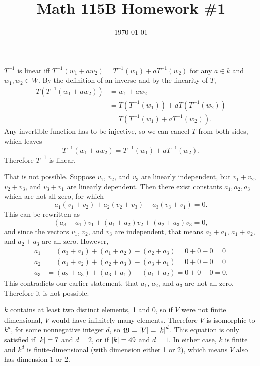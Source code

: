 \documentclass{article}
\date{\today}
\title{Math 115B Homework \#1}
\begin{document}
\maketitle

\begin{prob}
\end{prob}
$T^{-1}$ is linear iff $T^{-1}(w_1+a w_2) = T^{-1}(w_1)+ aT^{-1}(w_2)$ for any $a \in k$ and $w_1, w_2 \in W$. By the definition of an inverse and by the linearity of $T$,
\begin{align*}
    T(T^{-1}(w_1+aw_2)) &= w_1+aw_2 \\
                        &= T(T^{-1}(w_1))+a T(T^{-1}(w_2)) \\
                        &= T(T^{-1}(w_1)+aT^{-1}(w_2)).
\end{align*}
Any invertible function has to be injective, so we can cancel $T$ from both sides, which leaves
\[ T^{-1}(w_1+aw_2)=T^{-1}(w_1)+aT^{-1}(w_2). \]
Therefore $T^{-1}$ is linear.

\bigskip
\begin{prob}
\end{prob}
That is not possible. Suppose $v_1$, $v_2$, and $v_3$ are linearly independent, but $v_1+v_2$, $v_2+v_3$, and $v_3+v_1$ are linearly dependent. Then there exist constants $a_1, a_2, a_3$ which are not all zero, for which
\[ a_1(v_1+v_2)+a_2(v_2+v_3)+a_3(v_3+v_1)=0. \]
This can be rewritten as
\[ (a_3+a_1)v_1+(a_1+a_2)v_2+(a_2+a_3)v_3=0, \]
and since the vectors $v_1$, $v_2$, and $v_3$ are independent, that means $a_3+a_1$, $a_1+a_2$, and $a_2+a_3$ are all zero. However,
\begin{align*}
    a_1 &= (a_3+a_1)+(a_1+a_2)-(a_2+a_3)=0+0-0=0 \\
    a_2 &= (a_1+a_2)+(a_2+a_3)-(a_3+a_1)=0+0-0=0 \\
    a_3 &= (a_2+a_3)+(a_3+a_1)-(a_1+a_2)=0+0-0=0.
\end{align*}
This contradicts our earlier statement, that $a_1$, $a_2$, and $a_3$ are not all zero. Therefore it is not possible.

\bigskip
\begin{prob}
\end{prob}
$k$ contains at least two distinct elements, 1 and 0, so if $V$ were not finite dimensional, $V$ would have infinitely many elements. Therefore $V$ is isomorphic to $k^d$, for some nonnegative integer $d$, so $49=\left\lvert V \right\rvert=\left\lvert k \right\rvert^d$. This equation is only satisfied if $\left\lvert k \right\rvert=7$ and $d=2$, or if $\left\lvert k \right\rvert=49$ and $d=1$. In either case, $k$ is finite and $k^d$ is finite-dimensional (with dimension either 1 or 2), which means $V$ also has dimension 1 or 2.
\end{document}
